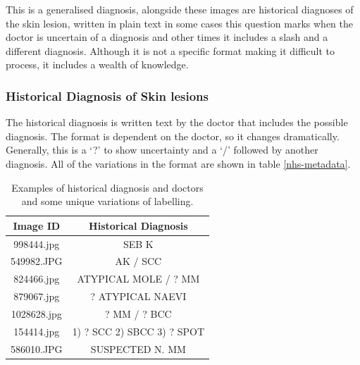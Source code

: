 This is a generalised diagnosis, alongside these images are historical diagnoses of the skin lesion, written in plain text in some cases this question marks when the doctor is uncertain of a diagnosis and other times it includes a slash and a different diagnosis. Although it is not a specific format making it difficult to process, it includes a wealth of knowledge.

\subsubsection{Historical Diagnosis of Skin lesions}

The historical diagnosis is written text by the doctor that includes the possible diagnosis. The format is dependent on the doctor, so it changes dramatically. Generally, this is a `?' to show uncertainty and a `/' followed by another diagnosis. All of the variations in the format are shown in table \ref{nhs-metadata}.

\begin{table}
    \centering
    \begin{tabular}{|c|c|}
        \hline
        Image ID & Historical Diagnosis
        \\
        \hline
        998444.jpg & SEB K
        \\
        \hline
        549982.JPG & AK / SCC
        \\
        \hline
        824466.jpg & ATYPICAL MOLE / ? MM
        \\
        \hline
        879067.jpg & ? ATYPICAL NAEVI
        \\
        \hline
        1028628.jpg & ? MM / ? BCC
        \\
        \hline
        154414.jpg & 1) ? SCC 2) SBCC 3) ? SPOT
        \\
        \hline
        586010.JPG & SUSPECTED N. MM
        \\
        \hline
    \end{tabular}
    \caption{Examples of historical diagnosis and doctors and some unique variations of labelling.}
\end{table}\label{nhs-metadata}        



